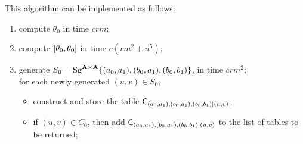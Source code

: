This algorithm can be implemented as follows:
 \begin{enumerate}
\item compute $\theta_0$ in time $crm$;
\item compute $[ \theta_0 ,  \theta_0 ]$ in time $c(rm^2 + n^5)$;
\item generate $S_0=\operatorname{Sg}^{\mathbf{A}\times \mathbf{A}} \{(a_0,a_1),(b_0,a_1),(b_0,b_1)\}$,
  in time $c r m^2$;\\
for each newly generated $(u,v) \in S_0$, 
  \begin{itemize}
  \item construct and store the table
    $\mathsf{C}_{(a_0,a_1),(b_0,a_1),(b_0,b_1)|(u,v)}$;
  \item if $(u,v) \in C_0$, then add $\mathsf{C}_{(a_0,a_1),(b_0,a_1),(b_0,b_1)|(u,v)}$
   to the list of tables to be returned; 
  \end{itemize}
\end{enumerate}






















\begin{comment}
\noindent \underline{\textbf{Subroutine \ld-2'}}\\[4pt]
To compute a \ldto for
$((a_0,b_0,1), (a_1, b_1, 0))$, obviously this is symmetric to
the situation handled in Subroutine LD2 and so the general algorithm
is the same.  Nonetheless, we include a listing of the computational
steps required so that later we can easily refer to this special case
of the general algorithm.
\begin{enumerate}[{\bf 1}]
\item Compute $\delta_1=\com{\thetaone}$;
\item form $C_1= \{b_0\}\times a_1/\delta_1 \leq \alg{A}\times\alg{A}$;
\item compute
      $S_1=\Sg^{\alg{A}\times \alg{A}} ((a_0,a_1),(a_0,b_1),(b_0,b_1))$;
\item find a term operation $t$ of $\alg{A}$ satisfying
\[t^{\alg{A}\times\alg{A}}((a_0,a_1),(a_0,b_1),(b_0,b_1)) =
 (t^{\alg{A}}(a_0,a_0,b_0), t^{\alg{A}}(a_1,b_1,b_1)) \in C_1 \cap S_1.\]
\end{enumerate}
Then $t$ is a \ldto for
$((a_0, b_0, 1), (a_1, b_1, 0))$.
\end{comment}




